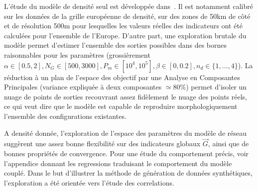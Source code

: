 L'étude du modèle de densité seul est développée dans~\cite{raimbault2016calibration}. Il est notamment calibré sur les données de la grille européenne de densité, sur des zones de 50km de côté et de résolution 500m pour lesquelles les valeurs réelles des indicateurs ont été calculées pour l'ensemble de l'Europe. D'autre part, une exploration brutale du modèle permet d'estimer l'ensemble des sorties possibles dans des bornes raisonnables pour les paramètres (grossièrement $\alpha \in [0.5,2],N_G\in [500,3000], P_m \in [10^4,10^5],\beta\in [0,0.2], n_d \in \{ 1, \ldots , 4\}$). La réduction à un plan de l'espace des objectif par une Analyse en Composantes Principales (variance expliquée à deux composantes $\simeq 80\%$) permet d'isoler un nuage de points de sorties recouvrant assez fidèlement le nuage des points réels, ce qui veut dire que le modèle est capable de reproduire morphologiquement l'ensemble des configurations existantes.



A densité donnée, l'exploration de l'espace des paramètres du modèle de réseau suggèrent une assez bonne flexibilité sur des indicateurs globaux $\vec{G}$, ainsi que de bonnes propriétés de convergence. Pour une étude du comportement précis, voir l'appendice donnant les regressions traduisant le comportement du modèle couplé. Dans le but d'illustrer la méthode de génération de données synthétiques, l'exploration a été orientée vers l'étude des correlations.

